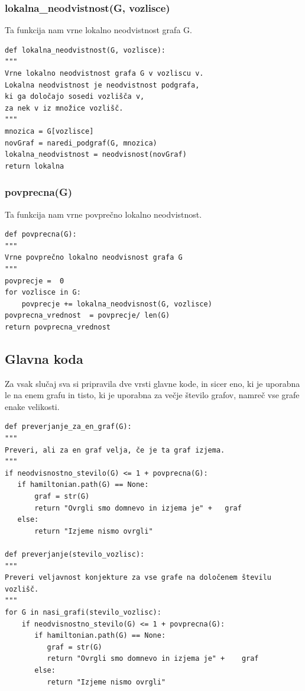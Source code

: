 \documentclass[12pt,a4paper]{amsart}
\theoremstyle{definition} %
\theoremstyle{plain} %
\begin{document}
\subsubsection{lokalna\_neodvistnost(G, vozlisce)}
Ta funkcija nam vrne lokalno neodvistnost grafa G.
\begin{verbatim}
def lokalna_neodvistnost(G, vozlisce):
"""
Vrne lokalno neodvistnost grafa G v vozliscu v.
Lokalna neodvistnost je neodvistnost podgrafa, 
ki ga določajo sosedi vozlišča v,
za nek v iz množice vozlišč.
"""
mnozica = G[vozlisce]
novGraf = naredi_podgraf(G, mnozica)
lokalna_neodvistnost = neodvisnost(novGraf)
return lokalna
\end{verbatim}

\subsubsection{povprecna(G)}
Ta funkcija nam vrne povprečno lokalno neodvistnost.
\begin{verbatim}
def povprecna(G):
"""
Vrne povprečno lokalno neodvisnost grafa G
"""
povprecje =  0
for vozlisce in G:
    povprecje += lokalna_neodvisnost(G, vozlisce)
povprecna_vrednost  = povprecje/ len(G)
return povprecna_vrednost
\end{verbatim}

\subsection{Glavna koda}
Za vsak slučaj sva si pripravila dve vrsti glavne kode, in sicer eno, ki je uporabna le na enem grafu in tisto, ki je uporabna za večje število grafov, namreč vse grafe enake velikosti.

\begin{verbatim}
def preverjanje_za_en_graf(G):
"""
Preveri, ali za en graf velja, če je ta graf izjema.
"""
if neodvisnostno_stevilo(G) <= 1 + povprecna(G):
   if hamiltonian.path(G) == None:
       graf = str(G)
       return "Ovrgli smo domnevo in izjema je" + 	graf
   else:
       return "Izjeme nismo ovrgli"

def preverjanje(stevilo_vozlisc):
"""
Preveri veljavnost konjekture za vse grafe na določenem številu vozlišč.
"""
for G in nasi_grafi(stevilo_vozlisc):
    if neodvisnostno_stevilo(G) <= 1 + povprecna(G):
       if hamiltonian.path(G) == None:
          graf = str(G)
          return "Ovrgli smo domnevo in izjema je" + 	graf
       else:
          return "Izjeme nismo ovrgli"
\end{verbatim}
\end{document}
